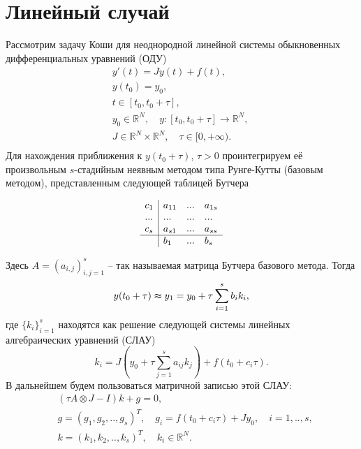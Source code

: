 \documentclass[a4paper, 14pt]{extreport} %
\begin{document}
\section{Линейный случай}
Рассмотрим задачу Коши для неоднородной линейной системы обыкновенных дифференциальных уравнений (ОДУ)
\begin{equation}
\begin{aligned}
\label{main_problem}
&y'(t)=Jy(t)+f(t),\\
&y(t_0)=y_0,\\
&t \in [t_0, t_0+\tau],\quad \\
&y_0\in \mathbb{R}^N,\quad
y:[t_0,t_0+\tau] \to \mathbb{R}^N,\quad\\
&J \in \mathbb{R}^N \times \mathbb{R}^N, \quad
\tau \in [0, +\infty).\\
\end{aligned}
\end{equation}
Для нахождения приближения к $y(t_0+\tau)$, $\tau >0$ проинтегрируем её произвольным $s$-стадийным неявным методом типа Рунге-Кутты (базовым методом), представленным следующей таблицей Бутчера
\begin{center}
\begin{equation}
\label{base_method}
\begin{array}{l|lll}
c_1& a_{11}& ...& a_{1s}\\
...& ...& ...& ...\\
c_s& a_{s1}& ...& a_{ss}\\
\hline
& b_1& ...& b_s\\
\end{array}
\end{equation}
\end{center}
Здесь $A=(a_{i,j})_{i,j=1}^s$ -- так называемая матрица Бутчера
базового метода. Тогда
$$ y(t_0+\tau)\thickapprox y_1=y_0+\tau\sum_{i=1}^sb_ik_i,$$
где $\{k_i\}_{i=1}^s$ находятся как решение следующей системы линейных алгебраических уравнений (СЛАУ)
$$k_i = J(y_0+\tau\sum_{j=1}^sa_{ij}k_j)+f(t_0+c_i\tau).$$
В дальнейшем будем пользоваться матричной записью этой СЛАУ:
\begin{equation}\label{system_for_solving}
\begin{aligned}
&(\tau A\otimes J-I)k+g=0,\\
&g=(g_1,g_2,..,g_s)^T, \quad g_i=f(t_0+c_i \tau)+Jy_0, \quad i=1,..,s,\\
&k=(k_1,k_2,..,k_s)^T, \quad k_i \in \mathbb{R}^N.\\
\end{aligned}
\end{equation}
\end{document}

